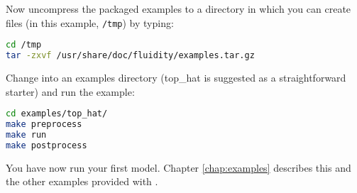 Now uncompress the packaged examples to a directory in which you can create
files (in this example, \lstinline[language=Bash]+/tmp+) by typing:

\begin{lstlisting}[language=Bash]
cd /tmp
tar -zxvf /usr/share/doc/fluidity/examples.tar.gz
\end{lstlisting}

Change into an examples directory (top\_hat is suggested as a straightforward
starter) and run the example:

\begin{lstlisting}[language=Bash]
cd examples/top_hat/
make preprocess
make run
make postprocess
\end{lstlisting}

You have now run your first \fluidity model. Chapter \ref{chap:examples}
describes this and the other examples provided with \fluidity.  
